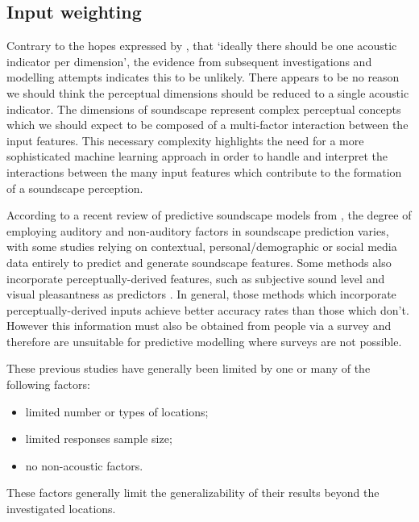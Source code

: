 \subsection{Input weighting}

Contrary to the hopes expressed by \citet{Aletta2014Towards}, that `ideally there should be one acoustic indicator per dimension', the evidence from subsequent investigations and modelling attempts \citep{Lionello2020systematic} indicates this to be unlikely. There appears to be no reason we should think the perceptual dimensions should be reduced to a single acoustic indicator. The dimensions of soundscape represent complex perceptual concepts which we should expect to be composed of a multi-factor interaction between the input features. This necessary complexity  highlights the need for a more sophisticated machine learning approach in order to handle and interpret the interactions between the many input features which contribute to the formation of a soundscape perception.

According to a recent review of predictive soundscape models from \citet{Lionello2020systematic}, the degree of employing auditory and non-auditory factors in soundscape prediction varies, with some studies relying on contextual, personal/demographic \citep{Erfanian2021Psychological,Tarlao2020Investigating} or social media \citep{Aiello2016Chatty} data entirely to predict and generate soundscape features. Some methods also incorporate perceptually-derived features, such as subjective sound level and visual pleasantness as predictors \citep{Lionello2020systematic}. In general, those methods which incorporate perceptually-derived inputs achieve better accuracy rates than those which don't. However this information must also be obtained from people via a survey and therefore are unsuitable for predictive modelling where surveys are not possible. 

These previous studies have generally been limited by one or many of the following factors:

\begin{itemize}
  \item limited number or types of locations;
  \item limited responses sample size;
  \item no non-acoustic factors.
\end{itemize}
These factors generally limit the generalizability of their results beyond the investigated locations.

